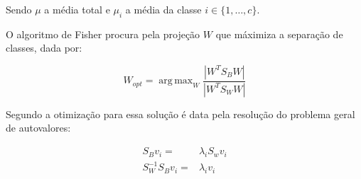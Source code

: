 Sendo $\mu$ a média total e $\mu_i$ a média da classe $i \in \{1,\ldots,c\}$.

O algoritmo de Fisher procura pela projeção $W$ que máximiza a separação de classes, dada por:

\begin{equation*}
W_{opt} = \operatorname{arg\,max}_{W} \frac{|W^T S_B W|}{|W^T S_W W|}
\end{equation*}

Segundo \cite{fisherfaces} a otimização para essa solução é data pela resolução do problema geral de autovalores:



\begin{align*} 
    S_{B} v_{i} = & \lambda_{i} S_w v_{i} \nonumber \\ 
    S_{W}^{-1} S_{B} v_{i} = & \lambda_{i} v_{i} 
\end{align*}


\label{sub:local_binary_patterns_histograms}


